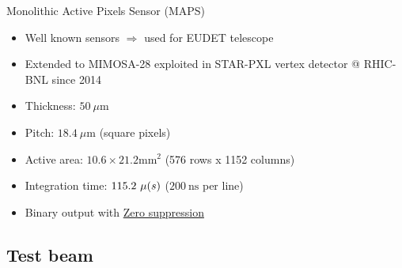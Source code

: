 \documentclass{beamer}
\newcommand{\grille}{
    \begin{tikzpicture}[overlay,remember picture]
        \begin{scope}[shift={(current page.south west)}]
            \draw[gray!50] (0,0) grid[step=2mm] (current page.north east);
            \draw[red!50] (0,0) grid[step=1cm] (current page.north east);
            \draw (0.2,1) node {1};
            \draw (0.2,2) node {2};
            \draw (0.2,3) node {3};
            \draw (0.2,4) node {4};
            \draw (0.2,5) node {5};
            \draw (0.2,6) node {6};
            \draw (0.2,7) node {7};
            \draw (0.2,8) node {8};
            \draw (0.2,9) node {9};
            \draw (1,0.5) node {1};
            \draw (2,0.5) node {2};
            \draw (3,0.5) node {3};
            \draw (4,0.5) node {4};
            \draw (5,0.5) node {5};
            \draw (6,0.5) node {6};
            \draw (7,0.5) node {7};
            \draw (8,0.5) node {8};
            \draw (9,0.5) node {9};
            \draw (10,0.5) node {10};
            \draw (11,0.5) node {11};
            \draw (12,0.5) node {12};
        \end{scope}
    \end{tikzpicture}
}
\begin{document}
\begin{frame}
  \vspace{-0.2cm}
  \begin{block}{Monolithic Active Pixels Sensor (MAPS)}
    \scriptsize{
    \begin{itemize}
      \item Well known sensors $\Rightarrow$ used for EUDET telescope
      \item Extended to MIMOSA-28 exploited in STAR-PXL vertex detector @ RHIC-BNL since 2014
      \item Thickness: $50~\mu\text{m}$
      \item Pitch: $18.4~\mu\text{m}$ (square pixels)
      \item Active area: $10.6 \times 21.2 \text{mm}^2$ (576 rows x 1152 columns)
      \item Integration time: $115.2~\mu\text(s)$ ($200~\text{ns}$ per line)
      \item Binary output with \hyperlink{suze}{Zero suppression}
    \end{itemize}
   }
  \end{block}

\end{frame}

  \subsection{Test beam}
\end{document}
